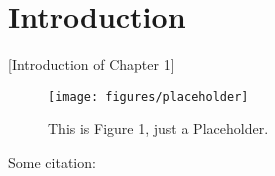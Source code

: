 
\section{Introduction}

[Introduction of Chapter 1]

\begin{figure}
    \texttt{[image: figures/placeholder]}
    \caption{This is Figure 1, just a Placeholder.}
\end{figure}


Some citation: \cite{Abbring2007}
